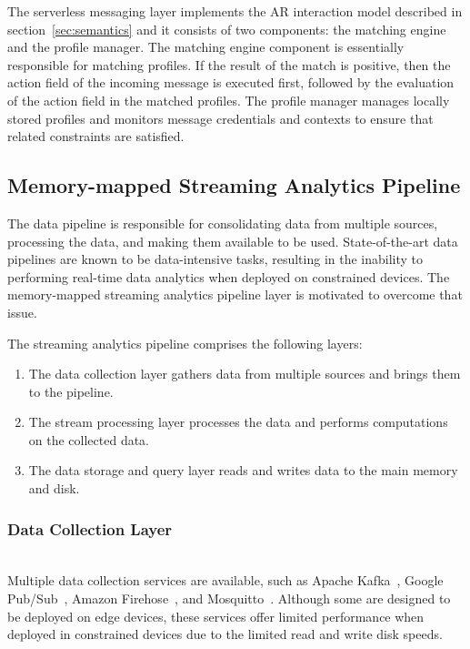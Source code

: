 The serverless messaging layer implements the AR interaction model described in section~\ref{sec:semantics} and it consists of two components: the matching engine and the profile manager. The matching engine component is essentially responsible for matching profiles. If the result of the match is positive, then the action field of the incoming message is executed first, followed by the evaluation of the action field in the matched profiles. The profile manager manages locally stored profiles and monitors message credentials and contexts to ensure that related constraints are satisfied.


\subsection{Memory-mapped Streaming Analytics Pipeline}
The data pipeline is responsible for consolidating data from multiple sources, processing the data, and making them available to be used. State-of-the-art data pipelines are known to be data-intensive tasks, resulting in the inability to performing real-time data analytics when deployed on constrained devices. The memory-mapped streaming analytics pipeline layer is motivated to overcome that issue.

The streaming analytics pipeline comprises the following layers: 

\begin{enumerate}

\item The data collection layer gathers data from multiple sources and brings them to the pipeline.
\item The stream processing layer processes the data and performs computations on the collected data.   
\item The data storage and query layer reads and writes data to the main memory and disk.

\end{enumerate}

\vspace{1ex}
\subsubsection{Data Collection Layer}
\hfill\\
Multiple data collection services are available, such as Apache Kafka~\cite{kafka}, Google Pub/Sub~\cite{google}, Amazon Firehose~\cite{amazon}, and Mosquitto~\cite{mosquitto}. Although some are designed to be deployed on edge devices, these services offer limited performance when deployed in constrained devices due to the limited read and write disk speeds.%

